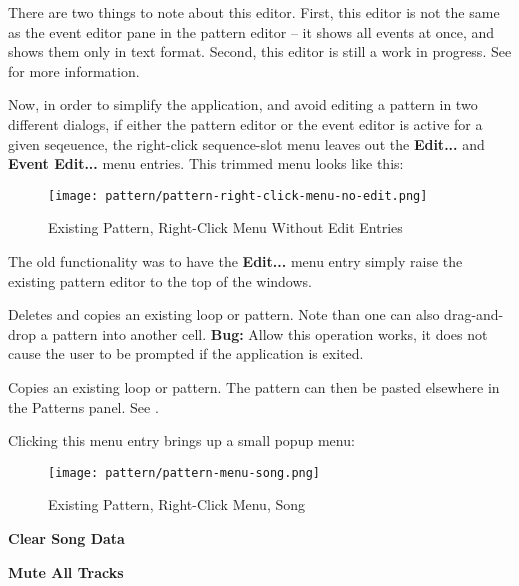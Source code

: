    There are two things to note about this editor.
   First, this editor is not the same as the event editor pane in the pattern
   editor -- it shows all events at once, and shows them only in text format.
   Second, this editor is still a work in progress.
   See  for more information.

   Now, in order to simplify the application, and avoid editing a pattern in
   two different dialogs, if either the pattern editor or the event editor is
   active for a given seqeuence, the right-click sequence-slot menu leaves out
   the \textbf{Edit...} and \textbf{Event Edit...} menu entries.
   This trimmed menu looks like this:

\begin{figure}[H]
   \centering 
   \texttt{[image: pattern/pattern-right-click-menu-no-edit.png]}
   \caption{Existing Pattern, Right-Click Menu Without Edit Entries}
   \label{fig:pattern_window_right_click_no_edit}
\end{figure}

   The old functionality was to have the \textbf{Edit...} menu entry simply
   raise the existing pattern editor to the top of the windows.

   Deletes and copies an existing loop or pattern.
   Note than one can also drag-and-drop a pattern into another cell.
   \textbf{Bug:}
   Allow this operation works, it does not cause the user to be prompted if the
   application is exited.

   Copies an existing loop or pattern.
   The pattern can then be pasted elsewhere in the Patterns panel.
   See .

   Clicking this menu entry brings up a small popup menu:

\begin{figure}[H]
   \centering 
   \texttt{[image: pattern/pattern-menu-song.png]}
   \caption{Existing Pattern, Right-Click Menu, Song}
   \label{fig:pattern_window_right_click_song}
\end{figure}

   \begin{enumber}
      \item \textbf{Clear Song Data}
      \item \textbf{Mute All Tracks}
   \end{enumber}

